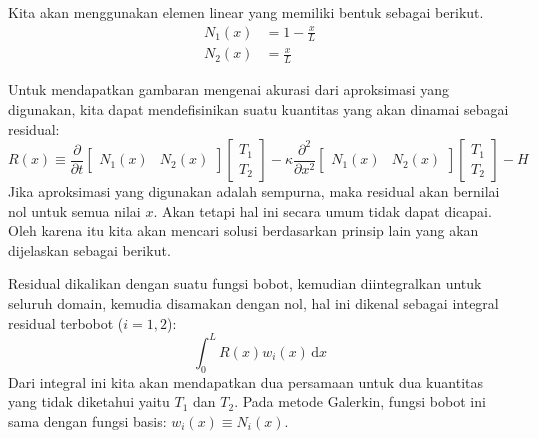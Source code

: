 Kita akan menggunakan elemen linear yang memiliki bentuk sebagai berikut.
\begin{align*}
N_{1}(x) & = 1 - \frac{x}{L} \\
N_{2}(x) & = \frac{x}{L}
\end{align*}

Untuk mendapatkan gambaran mengenai akurasi dari aproksimasi yang digunakan, kita
dapat mendefisinikan suatu kuantitas yang akan dinamai sebagai residual:
\begin{equation*}
R(x) \equiv
\frac{\partial}{\partial t} \begin{bmatrix}
N_{1}(x) & N_{2}(x) \end{bmatrix} \begin{bmatrix} T_{1} \\ T_{2} \end{bmatrix} -
\kappa \frac{\partial^2}{\partial x^2} \begin{bmatrix}
N_{1}(x) & N_{2}(x) \end{bmatrix} \begin{bmatrix} T_{1} \\ T_{2} \end{bmatrix} - H
\end{equation*}
Jika aproksimasi yang digunakan adalah sempurna, maka residual akan bernilai nol
untuk semua nilai $x$. Akan tetapi hal ini secara umum tidak dapat dicapai. Oleh karena
itu kita akan mencari solusi berdasarkan prinsip lain yang akan dijelaskan sebagai
berikut.

Residual dikalikan dengan suatu fungsi bobot, kemudian diintegralkan untuk seluruh
domain, kemudia disamakan dengan nol, hal ini dikenal sebagai
integral residual terbobot ($i=1,2$):
\begin{equation}
\int_{0}^{L} R(x) w_{i}(x) \, \mathrm{d}x
\end{equation}
Dari integral ini kita akan mendapatkan dua persamaan untuk dua kuantitas yang tidak diketahui
yaitu $T_1$ dan $T_2$.
Pada metode Galerkin, fungsi bobot ini sama dengan fungsi basis:
$w_{i}(x) \equiv N_{i}(x)$.

